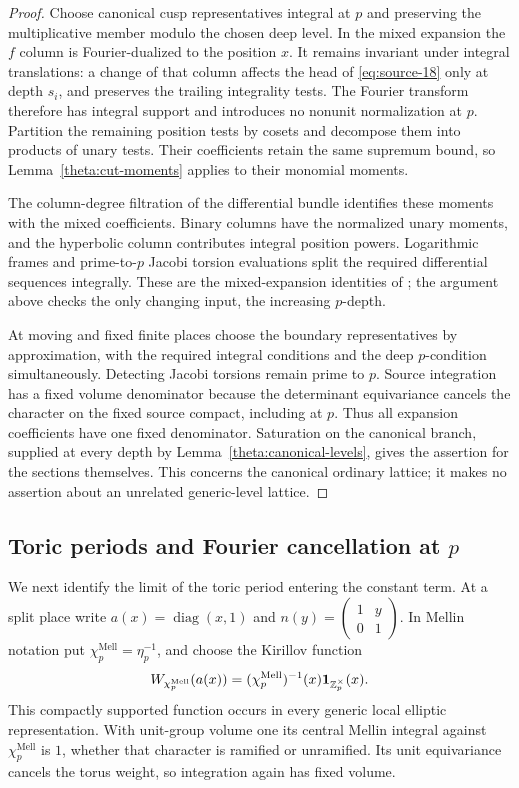 \begin{proof}
Choose canonical cusp representatives integral at $p$ and preserving
the multiplicative member modulo the chosen deep level.  In the
mixed expansion the $f$ column is Fourier-dualized to the position
$x$.  It remains invariant under integral translations: a change
of that column affects the head of \eqref{eq:source-18} only at
depth $s_i$, and preserves the trailing integrality tests.  The
Fourier transform therefore has integral support and introduces no
nonunit normalization at $p$.  Partition the remaining position
tests by cosets and decompose them into products of unary tests.
Their coefficients retain the same supremum bound, so
Lemma~\ref{theta:cut-moments} applies to their monomial moments.

The column-degree filtration of the differential bundle identifies
these moments with the mixed coefficients.  Binary columns have
the normalized unary moments, and the hyperbolic column contributes
integral position powers.  Logarithmic frames and prime-to-$p$
Jacobi torsion evaluations split the required differential
sequences integrally.  These are the mixed-expansion identities of
\cite[Lemma 4.5]{C}; the argument
above checks the only changing input, the increasing $p$-depth.

At moving and fixed finite places choose the boundary
representatives by approximation, with the required integral
conditions and the deep $p$-condition simultaneously.  Detecting
Jacobi torsions remain prime to $p$.  Source integration has a fixed
volume denominator because the determinant equivariance cancels
the character on the fixed source compact, including at $p$.
Thus all expansion coefficients have one fixed denominator.
Saturation on the canonical branch, supplied at every depth by
Lemma~\ref{theta:canonical-levels}, gives the assertion for the
sections themselves.  This concerns the canonical ordinary lattice;
it makes no assertion about an unrelated generic-level lattice.
\end{proof}

\subsection{Toric periods and Fourier cancellation at \texorpdfstring{$p$}{p}}

We next identify the limit of the toric period entering the constant
term.  At a split place write $a(x)=\operatorname{diag}(x,1)$ and
$n(y)=\left(\begin{smallmatrix}1&y\\0&1\end{smallmatrix}\right)$.
In Mellin notation put $\chi_p^{\mathrm{Mell}}=\eta_p^{-1}$, and
choose the Kirillov function
\[
 W_{\chi_p^{\mathrm{Mell}}}(a(x))
   =(\chi_p^{\mathrm{Mell}})^{-1}(x)
      \mathbf1_{\mathbb Z_p^\times}(x).
\]
This compactly supported function occurs in every generic local
elliptic representation.  With unit-group volume one its central
Mellin integral against $\chi_p^{\mathrm{Mell}}$ is $1$, whether
that character is ramified or unramified.  Its unit equivariance
cancels the torus weight, so integration again has fixed volume.

